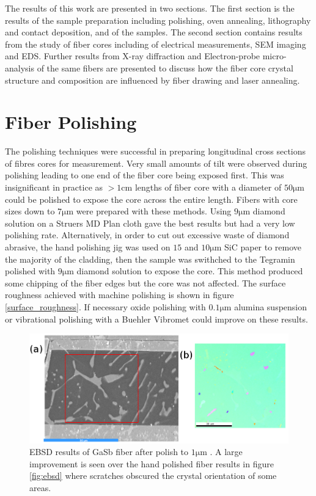 

The results of this work are presented in two sections. The first section is the results of the sample preparation including polishing, oven annealing, lithography and contact deposition, and of the samples. The second section contains results from the study of fiber cores including of electrical measurements, SEM imaging and EDS. Further results from X-ray diffraction and Electron-probe micro-analysis of the same fibers are presented to discuss how the fiber core crystal structure and composition are influenced by fiber drawing and laser annealing.

\section{Fiber Polishing}
The polishing techniques were successful in preparing longitudinal cross sections of fibres cores for measurement. Very small amounts of tilt were observed during polishing leading to one end of the fiber core being exposed first. This was insignificant in practice as $ > 1 \si{\cm}$ lengths of fiber core with a diameter of $50 \si{\micro\meter}$ could be polished to expose the core across the entire length. Fibers with core sizes down to $7 \si{\micro\meter}$ were prepared with these methods. Using $9 \si{\micro\meter}$ diamond solution on a Struers MD Plan cloth gave the best results but had a very low polishing rate. Alternatively, in order to cut out excessive waste of diamond abrasive, the hand polishing jig was used on $15$ and $10 \si{\micro\meter}$ SiC paper to remove the majority of the cladding, then the sample was swithched to the Tegramin polished with $9 \si{\micro\meter}$ diamond solution to expose the core. This method produced some chipping of the fiber edges but the core was not affected. The surface roughness achieved with machine polishing is shown in figure \ref{surface_roughness}. If necessary oxide polishing with $0.1 \si{\micro\meter}$ alumina suspension or vibrational polishing with a Buehler Vibromet could improve on these results.


\begin{figure}[h]
  \centering
  \includegraphics[width=\textwidth]{fig/ebsd_machinepolish.png}
  \caption{EBSD results of GaSb fiber after polish to $1\si{\micro\meter}$ \cite{Song2019LaserFibres}. A large improvement is seen over the hand polished fiber results in figure \ref{fig:ebsd} where scratches obscured the crystal orientation of some areas. }
  \label{fig:ebsd_2}
\end{figure}%


